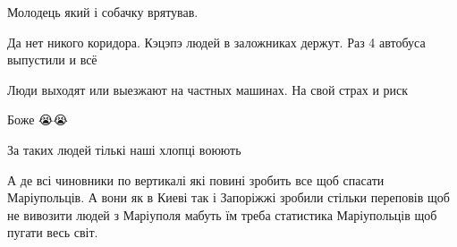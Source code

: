  
 
 
 
 

\qqSecCmt


Молодець який і собачку врятував.


Да нет никого коридора. Кэцэпэ людей в заложниках держут. Раз 4 автобуса выпустили и всё


Люди выходят или выезжают на частных машинах. На свой страх и риск


Боже 😭😭

За таких людей тількі наші хлопці воюють 🙏🏻


А де всі чиновники по вертикалі які повині зробить все щоб спасати
Маріупольців. А вони як в Киеві так і Запоріжжі зробили стільки переповів щоб
не вивозити людей з Маріуполя мабуть їм треба статистика Маріупольців щоб
пугати весь світ.
